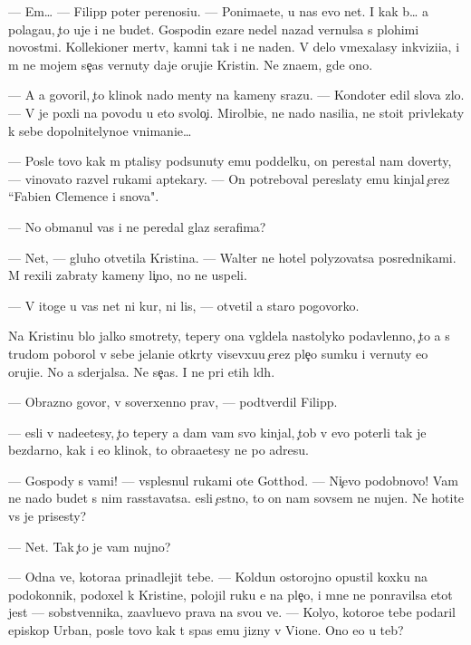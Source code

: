 \documentclass[10pt]{book}
\begin{document}
— Em… — Filipp poter perenosi{\q}u. — Ponima{\y}ete, u nas {\y}evo net. I kak b{\yi}… {\y}a polaga{\y}u, {\c}to uje i ne budet. Gospodin {\C}ezare nedel{\iu} nazad vernulsa s plohimi novost{\ia}mi. Kollek{\q}ioner mertv, kamni tak i ne na{\y}den{\yi}. V delo vmexalasy inkvizi{\q}i{\y}a, i m{\yi} ne mojem se{\y}{\c}as vernuty daje oruji{\y}e Kristin{\yi}. Ne zna{\y}em, gde ono.

— A {\y}a govoril, {\c}to klinok nado men{\ia}ty na kameny srazu. — Kondot{\y}er {\q}edil slova zlo. — V{\yi} je poxli na povodu u eto{\y} svolo{\c}i. Mirol{\iu}bi{\y}e, ne nado nasili{\y}a, ne sto{\y}it privlekaty k sebe dopolnitelyno{\y}e vnimani{\y}e…

— Posle tovo kak m{\yi} p{\yi}talisy podsunuty {\y}emu poddelku, on perestal nam dover{\ia}ty, — vinovato razvel rukami aptekary. — On potreboval pereslaty {\y}emu kinjal {\c}erez ``Fabien Clemence i s{\yi}nov{\y}a".

— No obmanul vas i ne peredal glaz serafima?

— Net, — gluho otvetila Kristina. — Walter ne hotel polyzovatsa posrednikami. M{\yi} rexili zabraty kameny li{\c}no, no ne uspeli.

— V itoge u vas net ni kur, ni lis{\yi}, — otvetil {\y}a staro{\y} pogovorko{\y}.

Na Kristinu b{\yi}lo jalko smotrety, tepery ona v{\yi}gl{\ia}dela nastolyko podavlenno{\y}, {\c}to {\y}a s trudom poborol v sebe jelani{\y}e otkr{\yi}ty visevxu{\y}u {\c}erez ple{\c}o sumku i vernuty {\y}e{\y}o oruji{\y}e. No {\y}a sderjalsa. Ne se{\y}{\c}as. I ne pri etih l{\iu}d{\ia}h.

— Obrazno govor{\ia}, v{\yi} soverxenno prav{\yi}, — podtverdil Filipp.

— {\Y}esli v{\yi} nade{\y}etesy, {\c}to tepery {\y}a dam vam svo{\y} kinjal, {\c}tob{\yi} v{\yi} {\y}evo poter{\ia}li tak je bezdarno, kak i {\y}e{\y}o klinok, to obra{\x}a{\y}etesy ne po adresu.

— Gospody s vami! — vsplesnul rukami ote{\q} Gotthod. — Ni{\c}evo podobnovo! Vam ne nado budet s nim rasstavatsa. {\Y}esli {\c}estno, to on nam sovsem ne nujen. Ne hotite vs{\e} je prisesty?

— Net. Tak {\c}to je vam nujno?

— Odna ve{\x}, kotora{\y}a prinadlejit tebe. — Koldun ostorojno opustil koxku na podokonnik, podoxel k Kristine, polojil ruku {\y}e{\y} na ple{\c}o, i mne ne ponravilsa etot jest — sobstvennika, za{\y}avl{\ia}{\y}u{\x}evo prava na svo{\y}u ve{\x}. — Koly{\q}o, kotoro{\y}e tebe podaril {\y}episkop Urban, posle tovo kak t{\yi} spas {\y}emu jizny v Vione. Ono {\y}e{\x}o u teb{\ia}?
\end{document}
